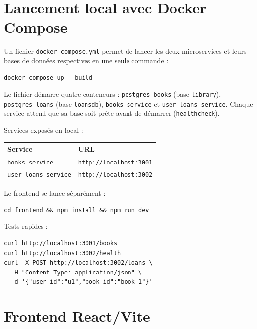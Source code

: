\documentclass[12pt,a4paper]{article}
\begin{document}
\section{Lancement local avec Docker Compose}

Un fichier \texttt{docker-compose.yml} permet de lancer les deux microservices
et leurs bases de données respectives en une seule commande :

\begin{Verbatim}[breaklines=true,breakanywhere=true]
docker compose up --build
\end{Verbatim}

Le fichier démarre quatre conteneurs : \texttt{postgres-books} (base \texttt{library}),
\texttt{postgres-loans} (base \texttt{loansdb}), \texttt{books-service} et \texttt{user-loans-service}.
Chaque service attend que sa base soit prête avant de démarrer (\texttt{healthcheck}).

Services exposés en local :

\begin{center}
\begin{tabular}{p{5cm} p{6cm}}
\toprule
Service & URL \\
\midrule
\texttt{books-service}       & \texttt{http://localhost:3001} \\
\texttt{user-loans-service}  & \texttt{http://localhost:3002} \\
\bottomrule
\end{tabular}
\end{center}

Le frontend se lance séparément :

\begin{Verbatim}[breaklines=true,breakanywhere=true]
cd frontend && npm install && npm run dev
\end{Verbatim}

Tests rapides :

\begin{Verbatim}[breaklines=true,breakanywhere=true]
curl http://localhost:3001/books
curl http://localhost:3002/health
curl -X POST http://localhost:3002/loans \
  -H "Content-Type: application/json" \
  -d '{"user_id":"u1","book_id":"book-1"}'
\end{Verbatim}

\section{Frontend React/Vite}
\end{document}
